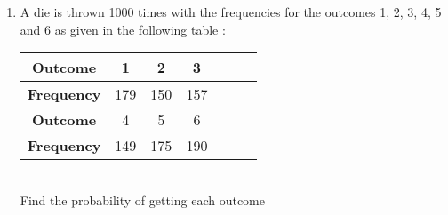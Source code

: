 \renewcommand{\theequation}{\theenumi}
\begin{enumerate}[label=\arabic*.,ref=\thesubsection.\theenumi]
\item A die is thrown 1000 times with the frequencies for the outcomes 1, 2, 3, 4, 5 and 6 as given in the following table :\\

\begin{tabular}{ |c|c|c|c|c|c|c| } 
	\hline
	\textbf{Outcome} &1 &2 &3 \\ 
	\hline
	\textbf{Frequency} &179 &150 &157  \\ 
	\hline
	\textbf{Outcome}  &4 &5 &6  \\ 
	\hline
	\textbf{Frequency}  &149 &175 &190 \\ 
	\hline
\end{tabular}\\

Find the probability of getting each outcome
\end{enumerate}